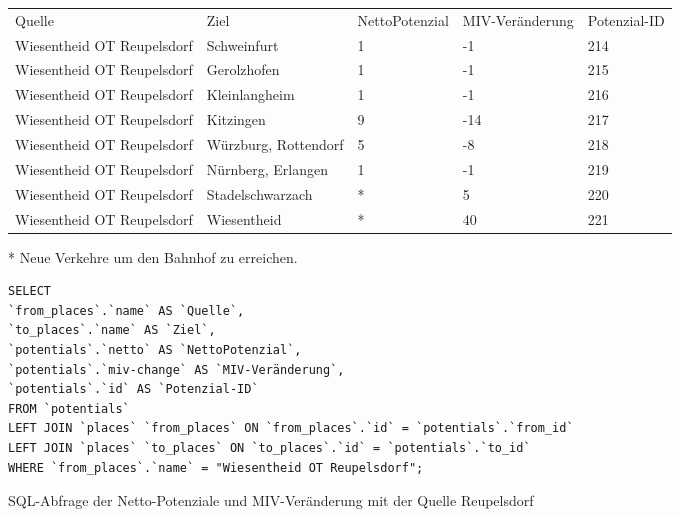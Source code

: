 \begin{tabular}{ l  l  l  l  l }
Quelle & Ziel & NettoPotenzial & MIV-Veränderung & Potenzial-ID\\ 
Wiesentheid OT Reupelsdorf & Schweinfurt & 1 & -1 & 214\\ 
Wiesentheid OT Reupelsdorf & Gerolzhofen & 1 & -1 & 215\\ 
Wiesentheid OT Reupelsdorf & Kleinlangheim & 1 & -1 & 216\\ 
Wiesentheid OT Reupelsdorf & Kitzingen & 9 & -14 & 217\\ 
Wiesentheid OT Reupelsdorf & Würzburg, Rottendorf & 5 & -8 & 218\\ 
Wiesentheid OT Reupelsdorf & Nürnberg, Erlangen & 1 & -1 & 219\\ 
Wiesentheid OT Reupelsdorf & Stadelschwarzach & * & 5 & 220\\ 
Wiesentheid OT Reupelsdorf & Wiesentheid & * & 40 & 221\\ 
\end{tabular}
\newline
\newline
* Neue Verkehre um den Bahnhof zu erreichen.
\newline
\begin{listing}[htbp]
\begin{verbatim}
SELECT
`from_places`.`name` AS `Quelle`, 
`to_places`.`name` AS `Ziel`, 
`potentials`.`netto` AS `NettoPotenzial`, 
`potentials`.`miv-change` AS `MIV-Veränderung`, 
`potentials`.`id` AS `Potenzial-ID`
FROM `potentials`
LEFT JOIN `places` `from_places` ON `from_places`.`id` = `potentials`.`from_id`
LEFT JOIN `places` `to_places` ON `to_places`.`id` = `potentials`.`to_id`
WHERE `from_places`.`name` = "Wiesentheid OT Reupelsdorf";
\end{verbatim}
\caption{SQL-Abfrage der Netto-Potenziale und MIV-Veränderung mit der Quelle Reupelsdorf}\label{lst-fz-reupelsdorf}
\end{listing}